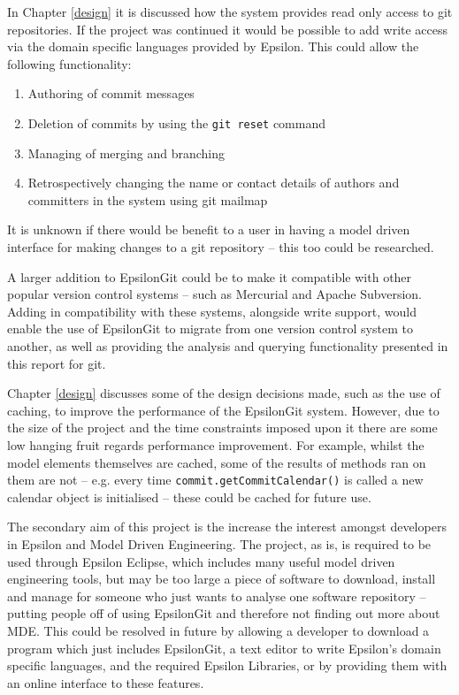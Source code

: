 \documentclass[11pt]{book}
\newcommand{\code}[1]{\texttt{#1}}
\begin{document}
In Chapter \ref{design} it is discussed how the system provides read only access to git repositories. If the project was continued it would be possible to add write access via the domain specific languages provided by Epsilon. This could allow the following functionality:

\begin{enumerate}
	\item Authoring of commit messages
	\item Deletion of commits by using the \code{git reset} command \cite{gitreset}
	\item Managing of merging and branching
	\item Retrospectively changing the name or contact details of authors and committers in the system using git mailmap \cite{gitmailmap}
\end{enumerate} 

It is unknown if there would be benefit to a user in having a model driven interface for making changes to a git repository -- this too could be researched. 

A larger addition to EpsilonGit could be to make it compatible with other popular version control systems -- such as Mercurial and Apache Subversion. Adding in compatibility with these systems, alongside write support, would enable the use of EpsilonGit to migrate from one version control system to another, as well as providing the analysis and querying functionality presented in this report for git.

Chapter \ref{design} discusses some of the design decisions made, such as the use of caching, to improve the performance of the EpsilonGit system. However, due to the size of the project and the time constraints imposed upon it there are some low hanging fruit regards performance improvement. For example, whilst the model elements themselves are cached, some of the results of methods ran on them are not -- e.g. every time \code{commit.getCommitCalendar()} is called a new calendar object is initialised -- these could be cached for future use.

The secondary aim of this project is the increase the interest amongst developers in Epsilon and Model Driven Engineering. The project, as is, is required to be used through Epsilon Eclipse, which includes many useful model driven engineering tools, but may be too large a piece of software to download, install and manage for someone who just wants to analyse one software repository -- putting people off of using EpsilonGit and therefore not finding out more about MDE. This could be resolved in future by allowing a developer to download a program which just includes EpsilonGit, a text editor to write Epsilon's domain specific languages, and the required Epsilon Libraries, or by providing them with an online interface to these features.
\end{document}
